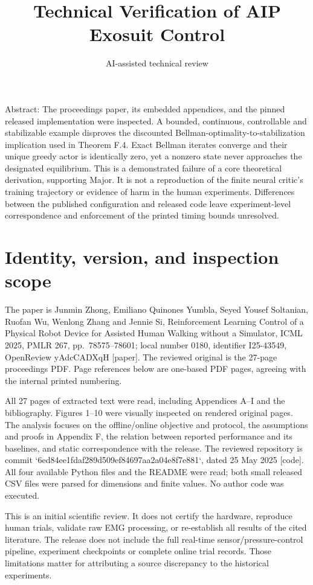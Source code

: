 \documentclass[10pt]{article}
\title{Technical Verification of AIP Exosuit Control}
\author{AI-assisted technical review}
\date{}
\begin{document}
\maketitle
Abstract: The proceedings paper, its embedded appendices, and the pinned released implementation were inspected. A bounded, continuous, controllable and stabilizable example disproves the discounted Bellman-optimality-to-stabilization implication used in Theorem F.4. Exact Bellman iterates converge and their unique greedy actor is identically zero, yet a nonzero state never approaches the designated equilibrium. This is a demonstrated failure of a core theoretical derivation, supporting Major. It is not a reproduction of the finite neural critic’s training trajectory or evidence of harm in the human experiments. Differences between the published configuration and released code leave experiment-level correspondence and enforcement of the printed timing bounds unresolved.\par
\section*{Identity, version, and inspection scope}
The paper is Junmin Zhong, Emiliano Quinones Yumbla, Seyed Yousef Soltanian, Ruofan Wu, Wenlong Zhang and Jennie Si, Reinforcement Learning Control of a Physical Robot Device for Assisted Human Walking without a Simulator, ICML 2025, PMLR 267, pp. 78575–78601; local number 0180, identifier I25-43549, OpenReview yAdcCADXqH [paper]. The reviewed original is the 27-page proceedings PDF. Page references below are one-based PDF pages, agreeing with the internal printed numbering.\par
All 27 pages of extracted text were read, including Appendices A–I and the bibliography. Figures 1–10 were visually inspected on rendered original pages. The analysis focuses on the offline/online objective and protocol, the assumptions and proofs in Appendix F, the relation between reported performance and its baselines, and static correspondence with the release. The reviewed repository is commit `6ed84ee1fdaf289d509ef84697aa2a04e8f7e881`, dated 25 May 2025 [code]. All four available Python files and the README were read; both small released CSV files were parsed for dimensions and finite values. No author code was executed.\par
This is an initial scientific review. It does not certify the hardware, reproduce human trials, validate raw EMG processing, or re-establish all results of the cited literature. The release does not include the full real-time sensor/pressure-control pipeline, experiment checkpoints or complete online trial records. Those limitations matter for attributing a source discrepancy to the historical experiments.\par
\end{document}
